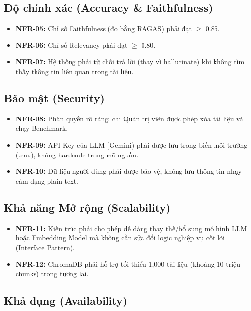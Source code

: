 \subsection{Độ chính xác (Accuracy \& Faithfulness)}

\begin{itemize}[itemsep=4pt]
  \item \textbf{NFR-05:} Chỉ số Faithfulness (đo bằng RAGAS) phải đạt $\geq$ 0.85.
  \item \textbf{NFR-06:} Chỉ số Relevancy phải đạt $\geq$ 0.80.
  \item \textbf{NFR-07:} Hệ thống phải từ chối trả lời (thay vì hallucinate) khi không tìm thấy thông tin liên quan trong tài liệu.
\end{itemize}

\subsection{Bảo mật (Security)}

\begin{itemize}[itemsep=4pt]
  \item \textbf{NFR-08:} Phân quyền rõ ràng: chỉ Quản trị viên được phép xóa tài liệu và chạy Benchmark.
  \item \textbf{NFR-09:} API Key của LLM (Gemini) phải được lưu trong biến môi trường (.env), không hardcode trong mã nguồn.
  \item \textbf{NFR-10:} Dữ liệu người dùng phải được bảo vệ, không lưu thông tin nhạy cảm dạng plain text.
\end{itemize}

\subsection{Khả năng Mở rộng (Scalability)}

\begin{itemize}[itemsep=4pt]
  \item \textbf{NFR-11:} Kiến trúc phải cho phép dễ dàng thay thế/bổ sung mô hình LLM hoặc Embedding Model mà không cần sửa đổi logic nghiệp vụ cốt lõi (Interface Pattern).
  \item \textbf{NFR-12:} ChromaDB phải hỗ trợ tối thiểu 1,000 tài liệu (khoảng 10 triệu chunks) trong tương lai.
\end{itemize}

\subsection{Khả dụng (Availability)}

